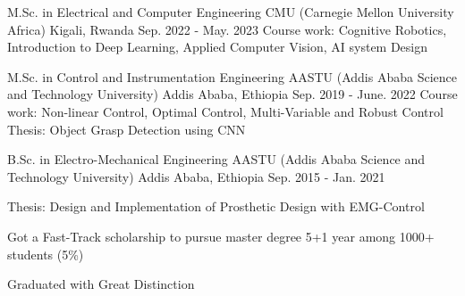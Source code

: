 

\begin{cventries}

  \cvEducation
    {M.Sc. in Electrical and Computer Engineering} %
    {CMU (Carnegie Mellon University Africa)} %
    {Kigali, Rwanda} %
    {Sep. 2022 - May. 2023} %
    {Course work: Cognitive Robotics, Introduction to Deep Learning, Applied Computer Vision, AI system Design} %
    {}

    \cvEducation
    {M.Sc. in Control and Instrumentation Engineering} %
    {AASTU (Addis Ababa Science and Technology University)} %
    {Addis Ababa, Ethiopia} %
    {Sep. 2019 - June. 2022} %
    {	Course work: Non-linear Control, Optimal Control, Multi-Variable and Robust Control
   		\newline
   		Thesis: Object Grasp Detection using CNN
    }
    {}

    \cvEducation
    {B.Sc. in Electro-Mechanical Engineering} %
    {AASTU (Addis Ababa Science and Technology University)} %
    {Addis Ababa, Ethiopia} %
    {Sep. 2015 - Jan. 2021} %
    {	Thesis: Design and Implementation of Prosthetic Design with EMG-Control
    	\vspace{2em}
      \begin{cvitems} %
        \item {Got a Fast-Track scholarship to pursue master degree 5+1 year among 1000+ students (5\%)}
        \item {Graduated with Great Distinction}
      \end{cvitems}
    }
    {}

\end{cventries}
